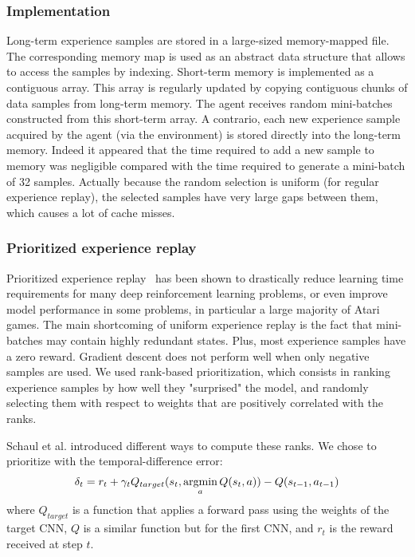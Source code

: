 \documentclass[letterpaper]{article}
\newcommand{\argmin}{\operatornamewithlimits{argmin}}
\begin{document}
\subsubsection{Implementation}

Long-term experience samples are stored in a large-sized memory-mapped file. The corresponding memory map is used as an abstract data structure that allows to access
the samples by indexing. Short-term memory is implemented as a contiguous array. This array is regularly updated by copying contiguous chunks of data samples from
long-term memory. The agent receives random mini-batches constructed from this short-term array. A contrario, each new experience sample acquired by the agent
(via the environment) is stored directly into the long-term memory. Indeed it appeared that the time required to add a new sample to memory was negligible 
compared with the time required to generate a mini-batch of 32 samples. Actually because the random selection is uniform (for regular experience replay),
the selected samples have very large gaps between them, which causes a lot of cache misses.

\subsubsection{Prioritized experience replay}

Prioritized experience replay~\citep{DBLP:journals/corr/SchaulQAS15} has been shown to drastically reduce learning time requirements for many deep
reinforcement learning problems, or even improve model performance in some problems, in particular a large majority of Atari games.
The main shortcoming of uniform experience replay is the fact that mini-batches may contain highly redundant states. Plus, most experience samples have
a zero reward. Gradient descent does not perform well when only negative samples are used. We used rank-based prioritization, which consists in ranking
experience samples by how well they "surprised" the model, and randomly selecting them with respect to weights that are positively correlated with the ranks.

Schaul et al. introduced different ways to compute these ranks. We chose to prioritize with the temporal-difference error:
\begin{multline}
    \delta_t = r_t + \gamma_t Q_{target}(s_t, \argmin_a Q(s_t, a)) - Q(s_{t-1}, a_{t-1})
\end{multline}
where $Q_{target}$ is a function that applies a forward pass using the weights of the target CNN, $Q$ is a similar function
but for the first CNN, and $r_t$ is the reward received at step $t$.
\end{document}
